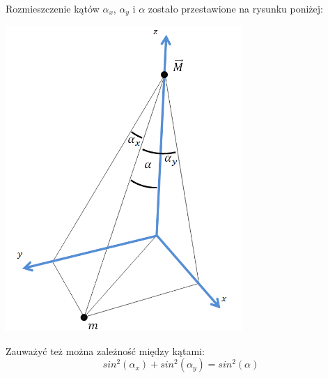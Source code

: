 \documentclass[10pt]{article}
\begin{document}
Rozmieszczenie kątów $\alpha_x$, $\alpha_y$ i $\alpha$ zostało przestawione na rysunku poniżej:
\begin{center}
\includegraphics[width=9cm]{pic2mod}
\end{center}

Zauważyć też można zależność między kątami:
\begin{equation}
sin^2(\alpha_x) + sin^2(\alpha_y) = sin^2(\alpha)
\end{equation}
\end{document}
